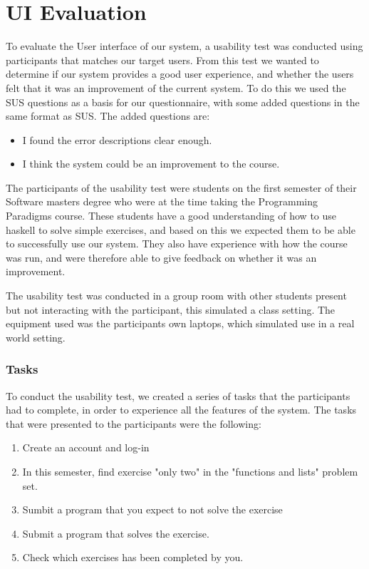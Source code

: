 \chapter{UI Evaluation} \label{chap:Evaluation}
To evaluate the User interface of our system, a usability test was conducted using participants that matches our target users. From this test we wanted to determine if our system provides a good user experience, and whether the users felt that it was an improvement of the current system.
To do this we used the SUS questions as a basis for our questionnaire, with some added questions in the same format as SUS. The added questions are:
\begin{itemize}
    \item I found the error descriptions clear enough.
    \item I think the system could be an improvement to the course.
\end{itemize}
The participants of the usability test were students on the first semester of their Software masters degree who were at the time taking the Programming Paradigms course. 
These students have a good understanding of how to use haskell to solve simple exercises, and based on this we expected them to be able to successfully use our system. They also have experience with how the course was run, and were therefore able to give feedback on whether it was an improvement.

The usability test was conducted in a group room with other students present but not interacting with the participant, this simulated a class setting. 
The equipment used was the participants own laptops, which simulated use in a real world setting.

\subsection*{Tasks}
To conduct the usability test, we created a series of tasks that the participants had to complete, in order to experience all the features of the system.
The tasks that were presented to the participants were the following:
\begin{enumerate}
    \item Create an account and log-in
    \item In this semester, find exercise "only two" in the "functions and lists" problem set.
    \item Sumbit a program that you expect to not solve the exercise
    \item Submit a program that solves the exercise.
    \item Check which exercises has been completed by you.
\end{enumerate}


